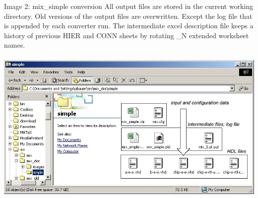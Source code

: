 \documentclass[a4paper,12pt]{article}
\begin{document}
Image 2: mix\_simple conversion\newline
All output files are stored in the current working directory. Old versions of the output files are overwritten. Except the log file that is appended by each converter run. The intermediate excel description file keeps a history of previous HIER and CONN sheets by rotating \_N extended worksheet names.\\
\\
\includegraphics[scale=0.6]{images/mix_files.jpg}\\
\end{document}
